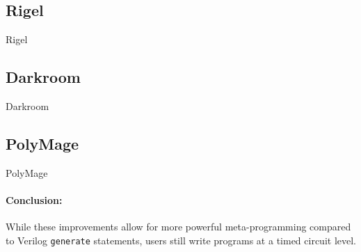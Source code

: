 \subsection{Rigel}
Rigel~\cite{hegarty_2016_rigel}
%

\subsection{Darkroom}
Darkroom~\cite{darkroom}
%

\subsection{PolyMage}
PolyMage~\cite{mullapudi_asplos_2015_polymage}




\paragraph{Conclusion: } While these improvements allow for more powerful meta-programming compared to Verilog \texttt{\small{generate}} statements, users still write programs at a timed circuit level.

